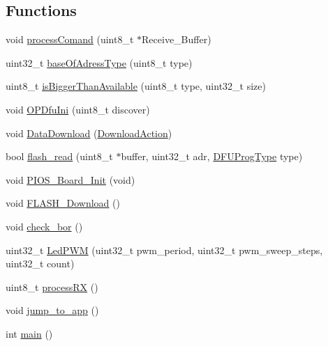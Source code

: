 \subsection*{\-Functions}
\begin{DoxyCompactItemize}
\item 
void \hyperlink{group___revo_mini_b_l_ga8afcf94fd6ff1db40e11fd55630584a9}{process\-Comand} (uint8\-\_\-t $\ast$\-Receive\-\_\-\-Buffer)
\item 
uint32\-\_\-t \hyperlink{group___revo_mini_b_l_gabf73792a7a60a0d6422d1f6ea2352779}{base\-Of\-Adress\-Type} (uint8\-\_\-t type)
\item 
uint8\-\_\-t \hyperlink{group___revo_mini_b_l_ga7111da0ee6b0c162893b1637e86b2758}{is\-Bigger\-Than\-Available} (uint8\-\_\-t type, uint32\-\_\-t size)
\item 
void \hyperlink{group___revo_mini_b_l_gaea62967f2bee630863cf887a1ff0a75c}{\-O\-P\-Dfu\-Ini} (uint8\-\_\-t discover)
\item 
void \hyperlink{group___revo_mini_b_l_gaa13fce2ea61d8acfbb8a1853d0160cc0}{\-Data\-Download} (\hyperlink{group___copter_control_b_l_ga3758da4ce9164f008216ba0fc2a82edc}{\-Download\-Action})
\item 
bool \hyperlink{group___revo_mini_b_l_ga8d71648e132eb8f61f76b3ec2247845c}{flash\-\_\-read} (uint8\-\_\-t $\ast$buffer, uint32\-\_\-t adr, \hyperlink{group___copter_control_b_l_ga0137f05f9f13737114e6bd864c448688}{\-D\-F\-U\-Prog\-Type} type)
\item 
void \hyperlink{group___revo_mini_b_l_ga902009c5b1cb57d9f9d60092eb7cacfb}{\-P\-I\-O\-S\-\_\-\-Board\-\_\-\-Init} (void)
\item 
void \hyperlink{group___revo_mini_b_l_ga7ec2ca9d0a908d6508dbc58c00eb18ec}{\-F\-L\-A\-S\-H\-\_\-\-Download} ()
\item 
void \hyperlink{group___revo_mini_b_l_ga7b0ed4e8687557e464541def703918fe}{check\-\_\-bor} ()
\item 
uint32\-\_\-t \hyperlink{group___revo_mini_b_l_ga75e30c099232f21fa6e08353b0dfcef7}{\-Led\-P\-W\-M} (uint32\-\_\-t pwm\-\_\-period, uint32\-\_\-t pwm\-\_\-sweep\-\_\-steps, uint32\-\_\-t count)
\item 
uint8\-\_\-t \hyperlink{group___revo_mini_b_l_ga37137877683fa8bb290bf36655ca2359}{process\-R\-X} ()
\item 
void \hyperlink{group___revo_mini_b_l_ga4b30467c425c173f9ddf827491be666c}{jump\-\_\-to\-\_\-app} ()
\item 
int \hyperlink{group___revo_mini_b_l_gae66f6b31b5ad750f1fe042a706a4e3d4}{main} ()

\end{DoxyCompactItemize}
